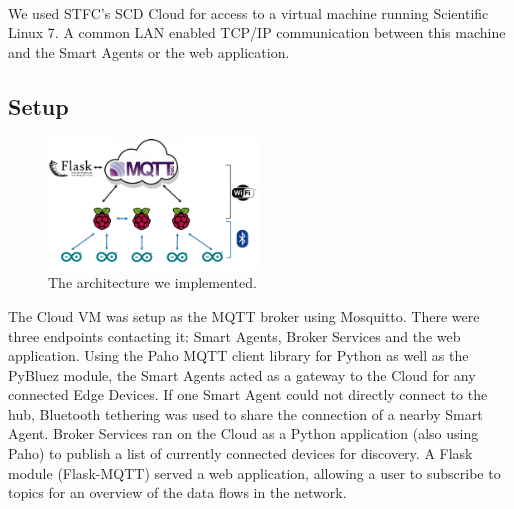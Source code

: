 \paragraph{}
We used STFC's SCD Cloud for access to a virtual machine running Scientific Linux 7. A common LAN enabled TCP/IP communication between this machine and the Smart Agents or the web application.


\subsection{Setup}

\begin{figure}
    \centering
    \includegraphics[width=0.5\textwidth]{Architecture.png}
    \caption{The architecture we implemented.}
    \label{fig:architecture}
\end{figure}

The Cloud VM was setup as the MQTT broker using Mosquitto. There were three endpoints contacting it: Smart Agents, Broker Services and the web application. Using the Paho MQTT client library for Python as well as the PyBluez module, the Smart Agents acted as a gateway to the Cloud for any connected Edge Devices. If one Smart Agent could not directly connect to the hub, Bluetooth tethering was used to share the connection of a nearby Smart Agent. Broker Services ran on the Cloud as a Python application (also using Paho) to publish a list of currently connected devices for discovery. A Flask module (Flask-MQTT) served a web application, allowing a user to subscribe to topics for an overview of the data flows in the network.

